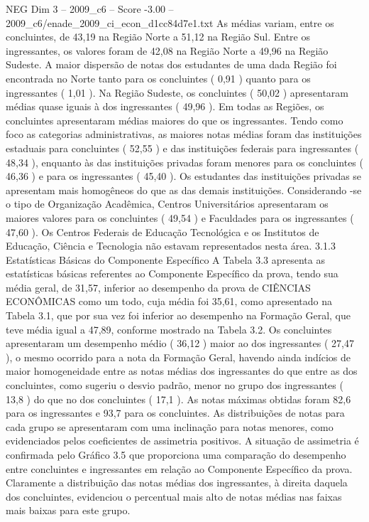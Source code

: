 \begin{textsample}{NEG Dim 3 – 2009\_c6 – Score -3.00 – 2009\_c6/enade\_2009\_ci\_econ\_d1cc84d7e1.txt}
As médias variam, entre os concluintes, de 43,19 na Região Norte a 51,12 na Região Sul.
Entre os ingressantes, os valores foram de 42,08 na Região Norte a 49,96 na Região Sudeste.
A maior dispersão de notas dos estudantes de uma dada Região foi encontrada no Norte tanto para os concluintes ( 0,91 ) quanto para os ingressantes ( 1,01 ).
Na Região Sudeste, os concluintes ( 50,02 ) apresentaram médias quase iguais à dos ingressantes ( 49,96 ).
Em todas as Regiões, os concluintes apresentaram médias maiores do que os ingressantes.
Tendo como foco as categorias administrativas, as maiores notas médias foram das instituições estaduais para concluintes ( 52,55 ) e das instituições federais para ingressantes ( 48,34 ), enquanto às das instituições privadas foram menores para os concluintes ( 46,36 ) e para os ingressantes ( 45,40 ).
Os estudantes das instituições privadas se apresentam mais homogêneos do que as das demais instituições.
Considerando -se o tipo de Organização Acadêmica, Centros Universitários apresentaram os maiores valores para os concluintes ( 49,54 ) e Faculdades para os ingressantes ( 47,60 ).
Os Centros Federais de Educação Tecnológica e os Institutos de Educação, Ciência e Tecnologia não estavam representados nesta área. 3.1.3 Estatísticas Básicas do Componente Específico A Tabela 3.3 apresenta as estatísticas básicas referentes ao Componente Específico da prova, tendo sua média geral, de 31,57, inferior ao desempenho da prova de CIÊNCIAS ECONÔMICAS como um todo, cuja média foi 35,61, como apresentado na Tabela 3.1, que por sua vez foi inferior ao desempenho na Formação Geral, que teve média igual a 47,89, conforme mostrado na Tabela 3.2.
Os concluintes apresentaram um desempenho médio ( 36,12 ) maior ao dos ingressantes ( 27,47 ), o mesmo ocorrido para a nota da Formação Geral, havendo ainda indícios de maior homogeneidade entre as notas médias dos ingressantes do que entre as dos concluintes, como sugeriu o desvio padrão, menor no grupo dos ingressantes ( 13,8 ) do que no dos concluintes ( 17,1 ).
As notas máximas obtidas foram 82,6 para os ingressantes e 93,7 para os concluintes.
As distribuições de notas para cada grupo se apresentaram com uma inclinação para notas menores, como evidenciados pelos coeficientes de assimetria positivos.
A situação de assimetria é confirmada pelo Gráfico 3.5 que proporciona uma comparação do desempenho entre concluintes e ingressantes em relação ao Componente Específico da prova.
Claramente a distribuição das notas médias dos ingressantes, à direita daquela dos concluintes, evidenciou o percentual mais alto de notas médias nas faixas mais baixas para este grupo.

\end{textsample}
